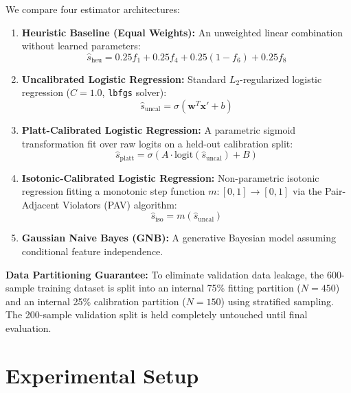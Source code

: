 \documentclass[journal,10pt]{IEEEtran}
\begin{document}
We compare four estimator architectures:
\begin{enumerate}
    \item \textbf{Heuristic Baseline (Equal Weights):} An unweighted linear combination without learned parameters:
    \begin{equation}
    \hat{s}_{\text{heu}} = 0.25 f_1 + 0.25 f_4 + 0.25 (1 - f_6) + 0.25 f_8
    \end{equation}
    \item \textbf{Uncalibrated Logistic Regression:} Standard $L_2$-regularized logistic regression ($C=1.0$, \texttt{lbfgs} solver):
    \begin{equation}
    \hat{s}_{\text{uncal}} = \sigma(\mathbf{w}^T \mathbf{x}' + b)
    \end{equation}
    \item \textbf{Platt-Calibrated Logistic Regression:} A parametric sigmoid transformation fit over raw logits on a held-out calibration split:
    \begin{equation}
    \hat{s}_{\text{platt}} = \sigma(A \cdot \text{logit}(\hat{s}_{\text{uncal}}) + B)
    \end{equation}
    \item \textbf{Isotonic-Calibrated Logistic Regression:} Non-parametric isotonic regression fitting a monotonic step function $m: [0, 1] \to [0, 1]$ via the Pair-Adjacent Violators (PAV) algorithm:
    \begin{equation}
    \hat{s}_{\text{iso}} = m(\hat{s}_{\text{uncal}})
    \end{equation}
    \item \textbf{Gaussian Naive Bayes (GNB):} A generative Bayesian model assuming conditional feature independence.
\end{enumerate}

\textbf{Data Partitioning Guarantee:} To eliminate validation data leakage, the 600-sample training dataset is split into an internal 75\% fitting partition ($N=450$) and an internal 25\% calibration partition ($N=150$) using stratified sampling. The 200-sample validation split is held completely untouched until final evaluation.

\section{Experimental Setup}
\end{document}

